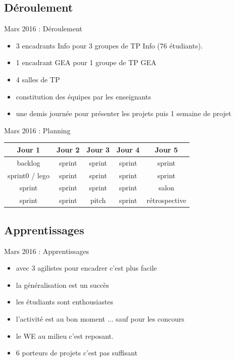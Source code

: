 \documentclass{beamer}
\begin{document}
\subsection{Déroulement}
\begin{frame}{Mars 2016 : Déroulement}
  \begin{itemize}
    \item 3 encadrants Info pour 3 groupes de TP Info (76 étudiants).
    \item 1 encadrant GEA pour 1 groupe de TP GEA
    \item 4 salles de TP
    \item constitution des équipes par les enseignants
    \item une demis journée pour présenter les projets puis 1 semaine de projet
  \end{itemize}
\end{frame}

\begin{frame}{Mars 2016 : Planning}
  \begin{center}
    \begin{tabular}{| c | c | c || c | c |}
      \hline
      \textbf{Jour 1} & \textbf{Jour 2} & \textbf{Jour 3} & \textbf{Jour 4} & \textbf{Jour 5} \\
      \hline \hline
      backlog         & sprint          & sprint          & sprint          & sprint          \\
      \hline
      sprint0 / lego  & sprint          & sprint          & sprint          & sprint          \\
      \hline \hline
      sprint          & sprint          & sprint          & sprint          & salon           \\
      \hline
      sprint          & sprint          & pitch           & sprint          & rétrospective   \\
      \hline
    \end{tabular}
  \end{center}
\end{frame}

\subsection{Apprentissages}
\begin{frame}{Mars 2016 : Apprentissages}
  \begin{itemize}
    \item avec 3 agilistes pour encadrer c'est plus facile
    \item la généralisation est un succès
    \item les étudiants sont enthousiastes
    \item l'activité est au bon moment ... sauf pour les concours
    \item le WE au milieu c'est reposant.
    \item 6 porteurs de projets c'est pas suffisant
  \end{itemize}
\end{frame}
\end{document}

